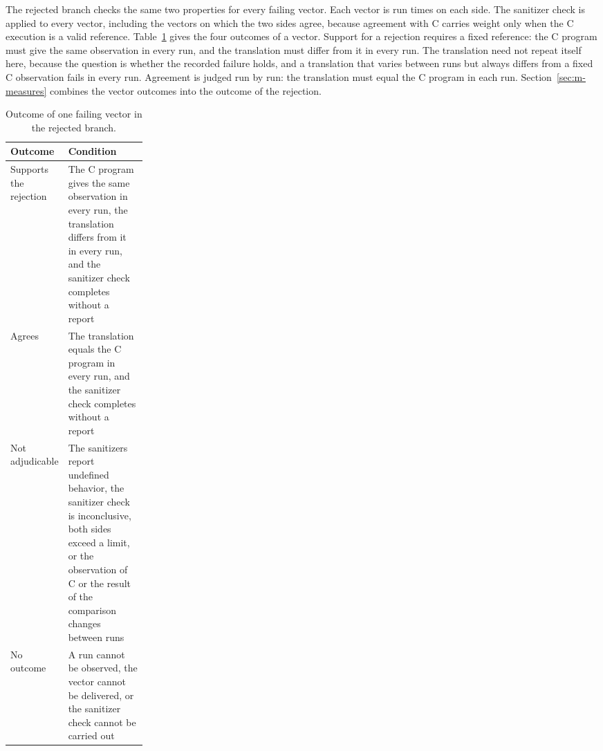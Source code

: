 The rejected branch checks the same two properties for every failing vector. Each vector is run \pRqTwoReps{} times on each side. The sanitizer check is applied to every vector, including the vectors on which the two sides agree, because agreement with C carries weight only when the C execution is a valid reference. Table~\ref{tab:m-vector} gives the four outcomes of a vector. Support for a rejection requires a fixed reference: the C program must give the same observation in every run, and the translation must differ from it in every run. The translation need not repeat itself here, because the question is whether the recorded failure holds, and a translation that varies between runs but always differs from a fixed C observation fails in every run. Agreement is judged run by run: the translation must equal the C program in each run. Section~\ref{sec:m-measures} combines the vector outcomes into the outcome of the rejection.

\begin{table}[!htb]
\centering
\small
\caption{Outcome of one failing vector in the rejected branch.}
\label{tab:m-vector}
\begin{tabularx}{\linewidth}{@{}p{0.23\linewidth}X@{}}
\toprule
Outcome & Condition \\
\midrule
Supports the rejection & The C program gives the same observation in every run, the translation differs from it in every run, and the sanitizer check completes without a report \\
Agrees & The translation equals the C program in every run, and the sanitizer check completes without a report \\
Not adjudicable & The sanitizers report undefined behavior, the sanitizer check is inconclusive, both sides exceed a limit, or the observation of C or the result of the comparison changes between runs \\
No outcome & A run cannot be observed, the vector cannot be delivered, or the sanitizer check cannot be carried out \\
\bottomrule
\end{tabularx}
\end{table}

